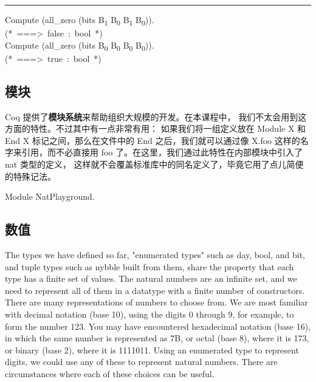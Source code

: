 \documentclass[utf8]{ctexart}
\begin{document}
\begin{center}\rule{0.5\linewidth}{\linethickness}\end{center}

{Compute} ({all\_zero} ({bits} {B\textsubscript{1}} {B\textsubscript{0}}
{B\textsubscript{1}} {B\textsubscript{0}})).\\
{(*~===\textgreater~false~:~bool~*)}\\
{Compute} ({all\_zero} ({bits} {B\textsubscript{0}} {B\textsubscript{0}}
{B\textsubscript{0}} {B\textsubscript{0}})).\\
{(*~===\textgreater~true~:~bool~*)}\\

\protect\hypertarget{lab29}{}{}

\hypertarget{ux6a21ux5757}{%
\subsection{模块}\label{ux6a21ux5757}}

Coq 提供了\textbf{模块系统}来帮助组织大规模的开发。在本课程中，
我们不太会用到这方面的特性。不过其中有一点非常有用：
如果我们将一组定义放在 {{Module}} {{X}} 和 {{End}} {{X}}
标记之间，那么在文件中的 {{End}} 之后，我们就可以通过像 {{X.foo}}
这样的名字来引用，而不必直接用 {{foo}}
了。在这里，我们通过此特性在内部模块中引入了 {{nat}} 类型的定义，
这样就不会覆盖标准库中的同名定义了，毕竟它用了点儿简便的特殊记法。

{Module} {NatPlayground}.\\

\protect\hypertarget{lab30}{}{}

\hypertarget{ux6570ux503c}{%
\subsection{数值}\label{ux6570ux503c}}

The types we have defined so far, "enumerated types" such as {{day}},
{{bool}}, and {{bit}}, and tuple types such as {{nybble}} built from
them, share the property that each type has a finite set of values. The
natural numbers are an infinite set, and we need to represent all of
them in a datatype with a finite number of constructors. There are many
representations of numbers to choose from. We are most familiar with
decimal notation (base 10), using the digits 0 through 9, for example,
to form the number 123. You may have encountered hexadecimal notation
(base 16), in which the same number is represented as 7B, or octal (base
8), where it is 173, or binary (base 2), where it is 1111011. Using an
enumerated type to represent digits, we could use any of these to
represent natural numbers. There are circumstances where each of these
choices can be useful.
\end{document}
